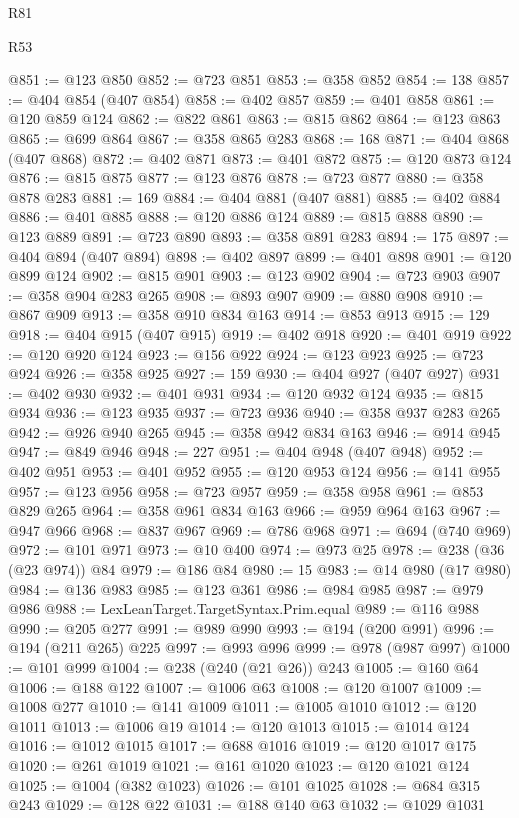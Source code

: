 \begin{lexlean}{R81}
\begin{lexlean}{R53}
\begin{coremodule}
{{{{{{{{{{{{{{{{{{{{{{{{{{{{{{{{{{{{{{{{{{{{{{{{{{{{{{{{{{{{{{{{{{{{{{{{{{{{{{{{{{{{{{{{{{{{{{{{{{{{{{{{{{{{{{{{@851 := @123 @850
@852 := @723 @851
@853 := @358 @852
@854 := 138
@857 := @404 @854 (@407 @854)
@858 := @402 @857
@859 := @401 @858
@861 := @120 @859 @124
@862 := @822 @861
@863 := @815 @862
@864 := @123 @863
@865 := @699 @864
@867 := @358 @865 @283
@868 := 168
@871 := @404 @868 (@407 @868)
@872 := @402 @871
@873 := @401 @872
@875 := @120 @873 @124
@876 := @815 @875
@877 := @123 @876
@878 := @723 @877
@880 := @358 @878 @283
@881 := 169
@884 := @404 @881 (@407 @881)
@885 := @402 @884
@886 := @401 @885
@888 := @120 @886 @124
@889 := @815 @888
@890 := @123 @889
@891 := @723 @890
@893 := @358 @891 @283
@894 := 175
@897 := @404 @894 (@407 @894)
@898 := @402 @897
@899 := @401 @898
@901 := @120 @899 @124
@902 := @815 @901
@903 := @123 @902
@904 := @723 @903
@907 := @358 @904 @283 @265
@908 := @893 @907
@909 := @880 @908
@910 := @867 @909
@913 := @358 @910 @834 @163
@914 := @853 @913
@915 := 129
@918 := @404 @915 (@407 @915)
@919 := @402 @918
@920 := @401 @919
@922 := @120 @920 @124
@923 := @156 @922
@924 := @123 @923
@925 := @723 @924
@926 := @358 @925
@927 := 159
@930 := @404 @927 (@407 @927)
@931 := @402 @930
@932 := @401 @931
@934 := @120 @932 @124
@935 := @815 @934
@936 := @123 @935
@937 := @723 @936
@940 := @358 @937 @283 @265
@942 := @926 @940 @265
@945 := @358 @942 @834 @163
@946 := @914 @945
@947 := @849 @946
@948 := 227
@951 := @404 @948 (@407 @948)
@952 := @402 @951
@953 := @401 @952
@955 := @120 @953 @124
@956 := @141 @955
@957 := @123 @956
@958 := @723 @957
@959 := @358 @958
@961 := @853 @829 @265
@964 := @358 @961 @834 @163
@966 := @959 @964 @163
@967 := @947 @966
@968 := @837 @967
@969 := @786 @968
@971 := @694 (@740 @969)
@972 := @101 @971
@973 := @10 @400
@974 := @973 @25
@978 := @238 (@36 (@23 @974)) @84
@979 := @186 @84
@980 := 15
@983 := @14 @980 (@17 @980)
@984 := @136 @983
@985 := @123 @361
@986 := @984 @985
@987 := @979 @986
@988 := LexLeanTarget.TargetSyntax.Prim.equal
@989 := @116 @988
@990 := @205 @277
@991 := @989 @990
@993 := @194 (@200 @991)
@996 := @194 (@211 @265) @225
@997 := @993 @996
@999 := @978 (@987 @997)
@1000 := @101 @999
@1004 := @238 (@240 (@21 @26)) @243
@1005 := @160 @64
@1006 := @188 @122
@1007 := @1006 @63
@1008 := @120 @1007
@1009 := @1008 @277
@1010 := @141 @1009
@1011 := @1005 @1010
@1012 := @120 @1011
@1013 := @1006 @19
@1014 := @120 @1013
@1015 := @1014 @124
@1016 := @1012 @1015
@1017 := @688 @1016
@1019 := @120 @1017 @175
@1020 := @261 @1019
@1021 := @161 @1020
@1023 := @120 @1021 @124
@1025 := @1004 (@382 @1023)
@1026 := @101 @1025
@1028 := @684 @315 @243
@1029 := @128 @22
@1031 := @188 @140 @63
@1032 := @1029 @1031
}}}}}}}}}}}}}}}}}}}}}}}}}}}}}}}}}}}}}}}}}}}}}}}}}}}}}}}}}}}}}}}}}}}}}}}}}}}}}}}}}}}}}}}}}}}}}}}}}}}}}}}}}}}}}}}}
\end{coremodule}
\end{lexlean}
\end{lexlean}
